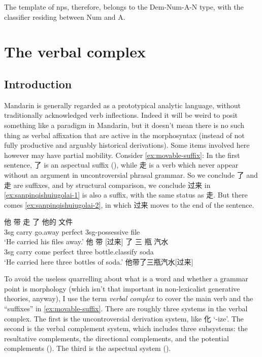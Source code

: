 \documentclass[UTF8, a4paper, oneside, scheme=plain]{ctexrep}
\newcommand*{\term}[1]{\emph{#1}}
\newcommand{\translate}[1]{`#1'}
\begin{document}
The template of \ac{np}s, therefore, belongs to the 
Dem-Num-A-N type,
with the classifier residing between Num and A. 


\chapter{The verbal complex}\label{chap:verbal-complex}

\section{Introduction}

Mandarin is generally regarded as a prototypical analytic language,
without traditionally acknowledged verb inflections.
Indeed it will be weird to posit something like a paradigm in Mandarin,
but it doesn't mean there is no such thing as verbal affixation that are active
in the morphosyntax 
(instead of not fully productive and arguably historical derivations).
Some items involved here however may have partial mobility.
Consider \eqref{ex:movable-suffix}:
In the first sentence, 
了 is an aspectual suffix (),
while 走 is a verb which never appear without an argument in uncontroversial phrasal grammar.
So we conclude 了 and 走 are suffixes,
and by structural comparison, 
we conclude 过来 in \eqref{ex:sanpinqishuiugolai-1} 
is also a suffix, with the same status as 走.
But there comes \eqref{ex:sanpinqishuiugolai-2},
in which 过来 moves to the end of the sentence.

\begin{exe}
    \ex \begin{xlist}
        \ex \gll 他 带 走 了 他的 文件  \\ 
        3sg carry go.away \acs{perfect} 3sg-\acs{possessive} file \\
        \glt \translate{He carried his files away.}
        \ex \gll 他 带 [过来] 了 三 瓶 汽水 \\
        3sg carry come \acs{perfect} three bottle.\acs{classify} soda \\
        \glt \translate{He carried here three bottles of soda.} 
        \label{ex:sanpinqishuiugolai-1}
        \ex 他带了三瓶汽水[过来]
        \label{ex:sanpinqishuiugolai-2}
    \end{xlist}
    \label{ex:movable-suffix}
\end{exe}

To avoid the useless quarrelling about what is a word and whether a grammar point is morphology
(which isn't that important in non-lexicalist generative theories, anyway),
I use the term \term{verbal complex} to cover 
the main verb and the  ``suffixes'' in \eqref{ex:movable-suffix}.
There are roughly three systems in the verbal complex.
The first is the uncontroversial derivation system,
like 化 \translate{-ize}.
The second is the verbal complement system,
which includes three subsystems:
the resultative complements, the directional complements, 
and the potential complements ().
The third is the aspectual system ().
\end{document}
